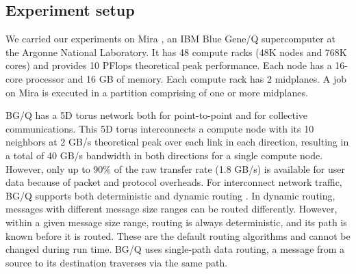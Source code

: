 \subsection{Experiment setup}
\label{sec:system}

We carried our experiments on Mira \cite{Chen:BGQ}, an IBM Blue Gene/Q supercomputer at the Argonne National Laboratory. It has 48 compute racks (48K nodes and 768K cores) and provides 10 PFlops theoretical peak performance. Each node has a 16-core processor and 16 GB of memory. Each compute rack has 2 midplanes. A job on Mira is executed in a partition comprising of one or more midplanes. 

BG/Q has a 5D torus network both for point-to-point and for collective communications. This 5D torus interconnects a compute node with its 10 neighbors at 2 GB/s theoretical peak over each link in each direction, resulting in a total of 40 GB/s bandwidth in both directions for a single compute node. However, only up to 90\% of the raw transfer rate (1.8 GB/s) is available for user data because of packet and protocol overheads.  
For interconnect network traffic, BG/Q supports both deterministic and dynamic routing \cite{Chen:BGQ}. In dynamic routing, messages with different message size ranges can be routed differently. However, within a given message size range, routing is always deterministic, and its path is known before it is routed. These are the default routing algorithms and cannot be changed during run time. BG/Q uses single-path data routing, a message from a source to its destination traverses via the same path.


